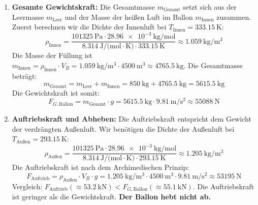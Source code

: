 \documentclass[ngerman]{scrreprt}
\newenvironment{loesungbox}[1]
  {\needspace{5\baselineskip}\begin{loesungboxstyle}[frametitle={#1}]}
  {\end{loesungboxstyle}}
\begin{document}
\begin{loesungbox}{Lösung zu \Cref{aufg:ballonfahrt}}
\begin{enumerate}
    \item \textbf{Gesamte Gewichtskraft:}
    Die Gesamtmasse $m_{\text{Gesamt}}$ setzt sich aus der Leermasse $m_{\text{Leer}}$ und der Masse der heißen Luft im Ballon $m_{\text{Innen}}$ zusammen. Zuerst berechnen wir die Dichte der Innenluft bei $T_{\text{Innen}} = \SI{333.15}{\kelvin}$:
    \begin{equation}
        \rho_{\text{Innen}} = \frac{\SI{101325}{\pascal} \cdot \SI{28.96e-3}{\kilo\gram\per\mol}}{\SI{8.314}{\joule\per(\mol\cdot\kelvin)} \cdot \SI{333.15}{\kelvin}} \approx \SI{1.059}{\kilo\gram\per\meter\cubed}
    \end{equation}
    Die Masse der Füllung ist $m_{\text{Innen}} = \rho_{\text{Innen}} \cdot V_B = \SI{1.059}{\kilo\gram\per\meter\cubed} \cdot \SI{4500}{\meter\cubed} \approx \SI{4765.5}{\kilo\gram}$.
    Die Gesamtmasse beträgt:
    \begin{equation}
        m_{\text{Gesamt}} = m_{\text{Leer}} + m_{\text{Innen}} = \SI{850}{\kilo\gram} + \SI{4765.5}{\kilo\gram} = \SI{5615.5}{\kilo\gram}
    \end{equation}
    Die Gewichtskraft ist somit:
    \begin{equation}
        F_{G, \text{Ballon}} = m_{\text{Gesamt}} \cdot g = \SI{5615.5}{\kilo\gram} \cdot \SI{9.81}{\meter\per\second\squared} \approx \SI{55088}{\newton}
    \end{equation}
    
    \item \textbf{Auftriebskraft und Abheben:}
    Die Auftriebskraft entspricht dem Gewicht der verdrängten Außenluft. Wir benötigen die Dichte der Außenluft bei $T_{\text{Außen}} = \SI{293.15}{\kelvin}$:
    \begin{equation}
        \rho_{\text{Außen}} = \frac{\SI{101325}{\pascal} \cdot \SI{28.96e-3}{\kilo\gram\per\mol}}{\SI{8.314}{\joule\per(\mol\cdot\kelvin)} \cdot \SI{293.15}{\kelvin}} \approx \SI{1.205}{\kilo\gram\per\meter\cubed}
    \end{equation}
    Die Auftriebskraft ist nach dem Archimedischen Prinzip:
    \begin{equation}
        F_{\text{Auftrieb}} = \rho_{\text{Außen}} \cdot V_B \cdot g = \SI{1.205}{\kilo\gram\per\meter\cubed} \cdot \SI{4500}{\meter\cubed} \cdot \SI{9.81}{\meter\per\second\squared} \approx \SI{53195}{\newton}
    \end{equation}
    Vergleich: $F_{\text{Auftrieb}} (\approx \SI{53.2}{\kilo\newton}) < F_{G, \text{Ballon}} (\approx \SI{55.1}{\kilo\newton})$.
    Die Auftriebskraft ist geringer als die Gewichtskraft. \textbf{Der Ballon hebt nicht ab.}


\end{enumerate}
\end{loesungbox}
\end{document}
